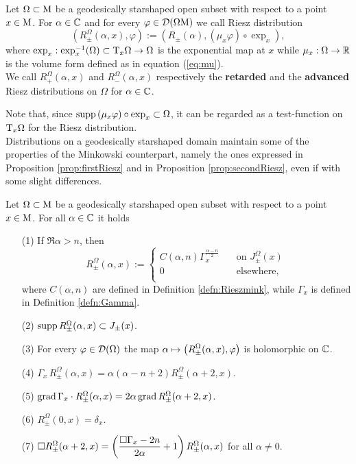 \begin{definition}
	Let $\Omega\subset\mathrm{M}$ be a geodesically starshaped open subset with respect to a point $x\in\mathrm{M}$. For  $\alpha\in{\mathbb C}$  and for every $\varphi\in\mathcal{D}(\Omega\mathrm{M})$ we call Riesz distribution
	\[	\left(R_\pm^\Omega(\alpha,x),\varphi\right):=\left(R_\pm(\alpha),(\mu_x\varphi)\circ\exp_x\right),	\]
	where $\exp_x:\exp_x^{-1}(\Omega)\subset\mathrm{T}_x\Omega\to\Omega$ is the exponential map at $x$ while $\mu_x:\Omega\to{\mathbb R}$ is the volume form defined as in equation (\ref{eq:mu}).\\
	We call $R_+^\Omega(\alpha,x)$ and $R_-^\Omega(\alpha,x)$ respectively the \textbf{retarded} and the \textbf{advanced} Riesz distributions on $\Omega$ for $\alpha\in{\mathbb C}$.
	\label{defn:rieszlocal}
\end{definition}

\noindent Note that, since $\text{supp}\,(\mu_x\varphi)\circ\exp_x\subset\Omega$, it can be regarded as a test-function on $\mathrm{T}_x\Omega$ for the Riesz distribution.\\

\noindent Distributions on a geodesically starshaped domain maintain some of the properties of the Minkowski counterpart, namely the ones expressed in Proposition \ref{prop:firstRiesz} and in Proposition \ref{prop:secondRiesz}, even if with some slight differences.

\begin{theorem}
	Let $\Omega\subset\mathrm{M}$ be a geodesically starshaped open subset with respect to a point $x\in\mathrm{M}$. For all $\alpha\in{\mathbb C}$ it holds
	\begin{enumerate}
		\item[(1)]If $\Re\alpha>n$, then 	\begin{equation}
				R_\pm^\Omega(\alpha,x):=\begin{cases}
			C(\alpha,n)\Gamma_x^{\frac{\alpha-n}{2}}\quad &\text{on } J_{\pm}^\Omega(x)\\
			0\qquad &\text{elsewhere},\\
			\end{cases}	
		\end{equation}
		where $C(\alpha,n)$ are defined in Definition \ref{defn:Rieszmink}, while $\Gamma_x$ is defined in Definition \ref{defn:Gamma}.
		\item[(2)] $\text{supp}\,R_\pm^\Omega(\alpha,x)\subset J_\pm(x)$.
		\item[(3)] For every $\varphi\in\mathcal{D}(\Omega)$ the map $\displaystyle\alpha\mapsto\left(R_\pm^\Omega(\alpha,x),\varphi\right)$ is holomorphic on ${\mathbb C}$.
		\item[(4)] $\Gamma_x\, R_\pm^\Omega(\alpha,x)=\alpha(\alpha-n+2)R_\pm^\Omega(\alpha+2,x)$.
		\item[(5)] $\operatorname{grad} \Gamma_x\cdot R_\pm^\Omega(\alpha,x)=2\alpha\operatorname{grad} R_\pm^\Omega(\alpha+2,x)$.
		\item[(6)] $R_\pm^\Omega(0,x)=\delta_x$.
		\item[(7)] $\displaystyle\Box R_\pm^\Omega(\alpha+2,x)=\left(\frac{\Box\Gamma_x-2n}{2\alpha}+1\right)R_\pm^\Omega(\alpha,x)$ for all $\alpha\neq0$.
		
	\end{enumerate}
\label{th:rieszdomain}
\end{theorem}
	
